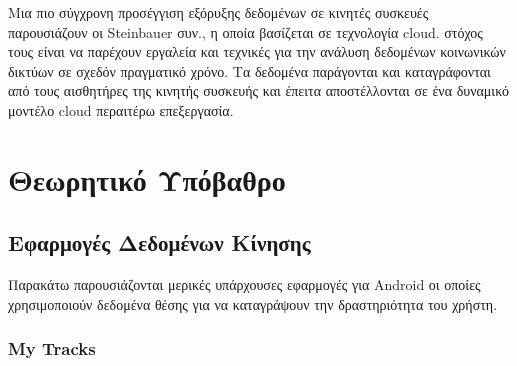 \documentclass[12pt,twoside,openright]{report}
\begin{document}
Μια πιο σύγχρονη προσέγγιση εξόρυξης δεδομένων σε κινητές συσκευές παρουσιάζουν οι \lt Steinbauer  συν.\cite{SteinbauerKK13}, η οποία βασίζεται σε τεχνολογία \lt cloud.  στόχος τους είναι να παρέχουν εργαλεία και τεχνικές για την ανάλυση δεδομένων κοινωνικών δικτύων σε σχεδόν πραγματικό χρόνο. Τα δεδομένα παράγονται και καταγράφονται από τους αισθητήρες της κινητής συσκευής και έπειτα αποστέλλονται  σε ένα δυναμικό μοντέλο \lt cloud  περαιτέρω επεξεργασία.
\chapter[Θεωρητικό Υπόβαθρο]{Θεωρητικό Υπόβαθρο}
\label{Chapter4}
\section[Εφαρμογές Δεδομένων Κίνησης]{Εφαρμογές Δεδομένων Κίνησης}
Παρακάτω παρουσιάζονται μερικές υπάρχουσες εφαρμογές για \lt Android \gt οι οποίες χρησιμοποιούν δεδομένα θέσης για να καταγράψουν την δραστηριότητα του χρήστη.
\subsection*{\lt My Tracks\gt }
\end{document}
